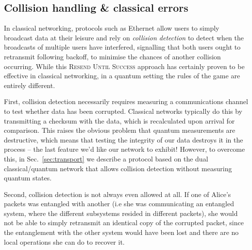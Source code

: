 %
%

\subsection{Collision handling \& classical errors} \label{sec:collision}  

In classical networking, protocols such as Ethernet allow users to simply broadcast data at their leisure and rely on \textit{collision detection} to detect when the broadcasts of multiple users have interfered, signalling that both users ought to retransmit following backoff, to minimise the chances of another collision occurring. While this \textsc{Resend Until Success} approach has certainly proven to be effective in classical networking, in a quantum setting the rules of the game are entirely different.

First, collision detection necessarily requires measuring a communications channel to test whether data has been corrupted. Classical networks typically do this by transmitting a checksum with the data, which is recalculated upon arrival for comparison. This raises the obvious problem that quantum measurements are destructive, which means that testing the integrity of our data destroys it in the process -- the last feature we'd like our network to exhibit! However, to overcome this, in Sec.~\ref{sec:transport} we describe a protocol based on the dual classical/quantum network that allows collision detection without measuring quantum states.

Second, collision detection is not always even allowed at all. If one of Alice's packets was entangled with another (i.e she was communicating an entangled system, where the different subsystems resided in different packets), she would not be able to simply retransmit an identical copy of the corrupted packet, since the entanglement with the other system would have been lost and there are no local operations she can do to recover it.

